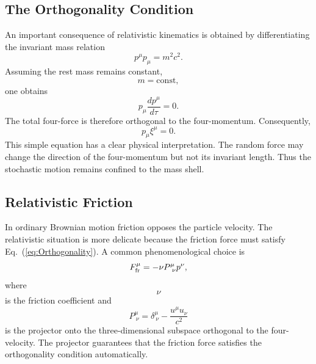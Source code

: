 \subsection{The Orthogonality Condition}
An important consequence of relativistic kinematics is obtained by
differentiating the invariant mass relation
\begin{equation}
p^\mu p_\mu=m^2c^2.
\label{eq:MassShellAgain}
\end{equation}
Assuming the rest mass remains constant,
\[m=\mathrm{const},\]
one obtains
\begin{equation}
p_\mu\frac{dp^\mu}{d\tau}=0.
\label{eq:Orthogonality}
\end{equation}
The total four-force is therefore orthogonal to the four-momentum.
Consequently,
\begin{equation}
\boxed{p_\mu\xi^\mu=0.}
\label{eq:NoiseOrthogonal}
\end{equation}
This simple equation has a clear physical interpretation.
The random force may change the direction of the four-momentum but not
its invariant length.
Thus the stochastic motion remains confined to the mass shell.
\subsection{Relativistic Friction}
In ordinary Brownian motion friction opposes the particle velocity.
The relativistic situation is more delicate because the friction force
must satisfy Eq.~(\ref{eq:Orthogonality}).
A common phenomenological choice is
\begin{equation}
F^\mu_{\rm fr}=-\nu P^{\mu}_{\ \nu}p^\nu ,
\label{eq:Friction}
\end{equation}
where
\[\nu\]
is the friction coefficient and
\begin{equation}
P^{\mu}_{\ \nu}=\delta^\mu_{\ \nu}-\frac{u^\mu u_\nu}{c^2}
\label{eq:Projector}
\end{equation}
is the projector onto the three-dimensional subspace orthogonal to the
four-velocity.
The projector guarantees that the friction force satisfies the
orthogonality condition automatically.
